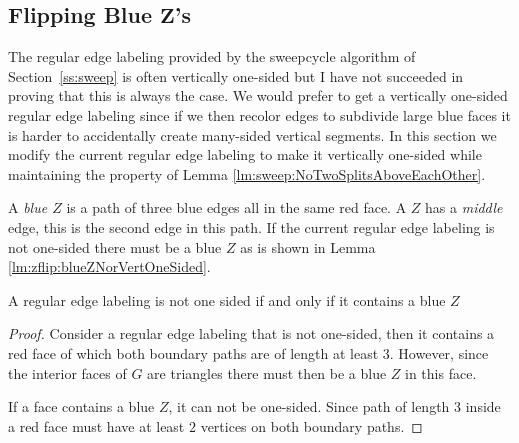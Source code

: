 
\subsection{Flipping Blue $\mathbf{Z}$'s}
\thispagestyle{plain}
\label{ss:flipBlueZ}

  The regular edge labeling provided by the sweepcycle algorithm of Section~\ref{ss:sweep} is often vertically one-sided but I have not succeeded in proving that this is always the case.
  We would prefer to get a vertically one-sided regular edge labeling since if we then recolor edges to subdivide large blue faces it is harder to accidentally create many-sided vertical segments.
  In this section we modify the current regular edge labeling to make it vertically one-sided while maintaining the property of Lemma \ref{lm:sweep:NoTwoSplitsAboveEachOther}.


  A \emph{blue $Z$} is a path of three blue edges all in the same red face. A $Z$ has a \emph{middle} edge, this is the second edge in this path.
  If the current regular edge labeling is not one-sided there must be a blue $Z$ as is shown in Lemma \ref{lm:zflip:blueZNorVertOneSided}.
  \begin{lemma}
    \label{lm:zflip:blueZNorVertOneSided}
    A regular edge labeling is not one sided if and only if it contains a blue $Z$
  \end{lemma}
  \begin{proof}
    Consider a regular edge labeling that is not one-sided, then it contains a red face of which both boundary paths are of length at least $3$.
    However, since the interior faces of $G$ are triangles there must then be a blue $Z$ in this face.

    If a face contains a blue $Z$, it can not be one-sided. Since path of length $3$ inside a red face must have at least $2$ vertices on both boundary paths.
  \end{proof}

